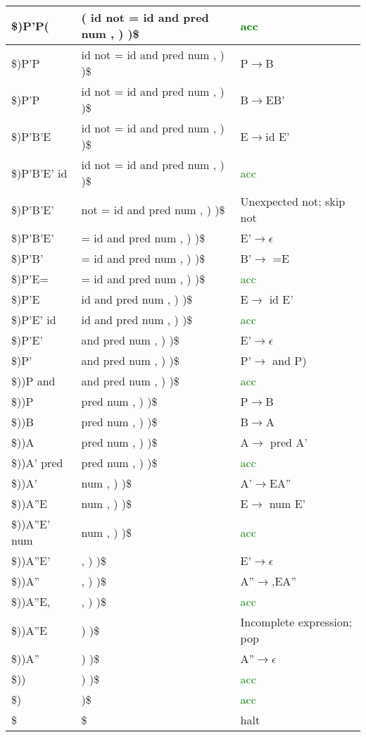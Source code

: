 \documentclass[11pt, a4paper]{article}
\begin{document}
\begin{table}[!ht]
\begin{tabular}{|l|l|l|}
        \$)P'P( & ( id not = id and pred num , ) )\$ & \textcolor{green}{acc} \\ \hline
        \$)P'P & id not = id and pred num , ) )\$ & P$\rightarrow$B \\ \hline
        \$)P'P & id not = id and pred num , ) )\$ & B$\rightarrow$EB' \\ \hline
        \$)P'B'E & id not = id and pred num , ) )\$ & E$\rightarrow$id E' \\ \hline
        \$)P'B'E' id & id not = id and pred num , ) )\$ & \textcolor{green}{acc} \\ \hline
        \$)P'B'E' & not = id and pred num , ) )\$ & Unexpected not; skip not \\ \hline
        \$)P'B'E' & = id and pred num , ) )\$ & E'$\rightarrow$$\epsilon$ \\ \hline
        \$)P'B' & = id and pred num , ) )\$ & B'$\rightarrow$ =E \\ \hline
        \$)P'E= & = id and pred num , ) )\$ & \textcolor{green}{acc} \\ \hline
        \$)P'E & id and pred num , ) )\$ & E$\rightarrow$ id E' \\ \hline
        \$)P'E' id & id and pred num , ) )\$ & \textcolor{green}{acc} \\ \hline
        \$)P'E' & and pred num , ) )\$ & E'$\rightarrow$$\epsilon$ \\ \hline
        \$)P' & and pred num , ) )\$ & P'$\rightarrow$ and P) \\ \hline
        \$))P and & and pred num , ) )\$ & \textcolor{green}{acc} \\ \hline
        \$))P & pred num , ) )\$ & P$\rightarrow$B \\ \hline
        \$))B & pred num , ) )\$ & B$\rightarrow$A \\ \hline
        \$))A & pred num , ) )\$ & A$\rightarrow$ pred A' \\ \hline
        \$))A' pred & pred num , ) )\$ & \textcolor{green}{acc} \\ \hline
        \$))A' & num , ) )\$ & A'$\rightarrow$EA'' \\ \hline
        \$))A''E & num , ) )\$ & E$\rightarrow$ num E' \\ \hline
        \$))A''E' num & num , ) )\$ & \textcolor{green}{acc} \\ \hline
        \$))A''E' & , ) )\$ & E'$\rightarrow$$\epsilon$ \\ \hline
        \$))A'' & , ) )\$ & A''$\rightarrow$,EA'' \\ \hline
        \$))A''E, & , ) )\$ & \textcolor{green}{acc} \\ \hline
        \$))A''E & ) )\$ & Incomplete expression; pop \\ \hline
        \$))A'' & ) )\$ & A''$\rightarrow$$\epsilon$ \\ \hline
        \$)) & ) )\$ & \textcolor{green}{acc} \\ \hline
        \$) & )\$ & \textcolor{green}{acc} \\ \hline
        \$ & \$ & halt \\ \hline
    \end{tabular}
\end{table}
\end{document}
